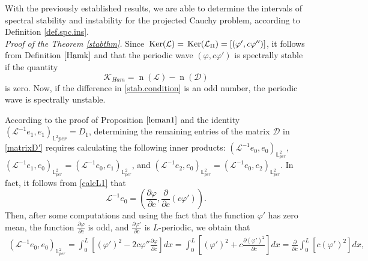 \documentclass[12pt,reqno,a4paper]{amsart} %
\newcommand{\Ker}{{\rm \,Ker}}
\numberwithin{equation}{section}
\numberwithin{figure}{section}
\begin{document}
With the previously established results, we are able to determine the intervals of spectral stability and instability for the projected Cauchy problem, according to Definition \ref{def.spc.ins}. \\


\noindent\textit{Proof of the Theorem \ref{stabthm}.} Since $\Ker(\mathcal{L})=\Ker(\mathcal{L}_{\Pi})=[(\varphi',c\varphi'')]$, it follows from Definition $\ref{Hamk}$ and \cite[Theorem 7.1.5]{kapitula} that the periodic wave $(\varphi, c\varphi')$ is spectrally stable if the quantity
\begin{equation}\label{stab.condition}
	\mathcal{K}_{Ham}=\operatorname{n}(\mathcal{L}) - \operatorname{n}(\mathcal{D})
\end{equation}
is zero. Now, if the difference in \eqref{stab.condition} is an odd number, the periodic wave is spectrally unstable.
 
According to the proof of Proposition $\ref{leman1}$ and the identity $(\mathcal{L}^{-1}e_1,e_1)_{\mathbb{L}^2{per}}=D_1$, determining the remaining entries of the matrix $\mathcal{D}$ in \eqref{matrixD'} requires calculating the following inner products:
 $(\mathcal{L}^{-1}e_0,e_0)_{\mathbb{L}^2_{per}}$, $(\mathcal{L}^{-1}e_1,e_0)_{\mathbb{L}^2_{per}}=	(\mathcal{L}^{-1}e_0,e_1)_{\mathbb{L}^2_{per}}$, and $(\mathcal{L}^{-1}e_2,e_0)_{\mathbb{L}^2_{per}}=		(\mathcal{L}^{-1}e_0,e_2)_{\mathbb{L}^2_{per}}$. In fact, it follows from \eqref{calcL1} that \begin{equation}\nonumber
 	\mathcal{L}^{-1}e_0=	 \left(\frac{\partial\varphi}{\partial c},\frac{\partial}{\partial c}(c\varphi')\right) .
 \end{equation}
 Then, after some computations and using the fact that the function $\varphi'$ has zero mean, the function $\frac{\partial\varphi}{\partial c}$ is odd, and $\frac{\partial\varphi'}{\partial c}$ is $L$-periodic, we obtain that 
 \begin{align}\label{eqD1}
 	(\mathcal{L}^{-1}e_0,e_0)_{\mathbb{L}^2_{per}} =\int_{0}^{L}\left[(\varphi')^2- 2c\varphi''\frac{\partial\varphi}{\partial c}\right]dx=\int_{0}^{L}\left[(\varphi')^2+ c\frac{\partial(\varphi')^2}{\partial c}\right]dx=\frac{\partial}{\partial c}\int_0^L[c(\varphi')^2]dx,
 \end{align}
 
\end{document}
